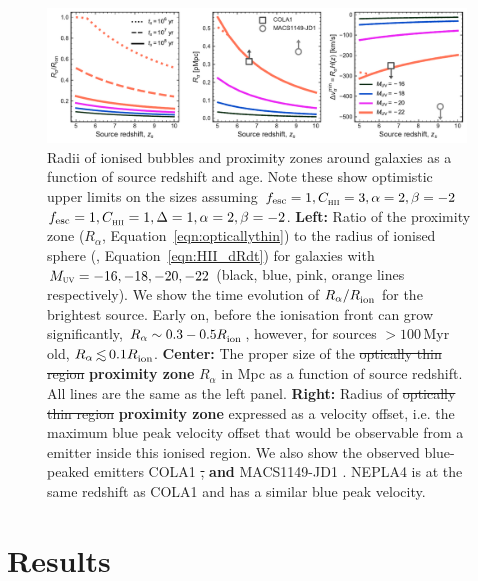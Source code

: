 \documentclass[fleqn,usenatbib]{mnras}
\providecommand{\DIFadd}[1]{{\protect\color{Green} \bf #1}} %
\providecommand{\DIFdel}[1]{{\protect\color{lightgray} \footnotesize \sout{#1}}} %
\providecommand{\DIFaddFL}[1]{\DIFadd{#1}} %
\providecommand{\DIFdelFL}[1]{\DIFdel{#1}} %
\providecommand{\DIFaddbeginFL}{} %
\providecommand{\DIFaddendFL}{} %
\providecommand{\DIFdelbeginFL}{} %
\providecommand{\DIFdelendFL}{} %
\newcommand{\DIFscaledelfig}{0.5}
\newlength{\DIFdelgraphicswidth} %
\newlength{\DIFdelgraphicsheight} %
\newcommand{\DIFaddincludegraphics}[2][]{{\color{blue}\fbox{\DIFOincludegraphics[#1]{#2}}}} %
\newcommand{\DIFdelincludegraphics}[2][]{%
\sbox{\DIFdelgraphicsbox}{\DIFOincludegraphics[#1]{#2}}%
\settoboxwidth{\DIFdelgraphicswidth}{\DIFdelgraphicsbox} %
\settoboxtotalheight{\DIFdelgraphicsheight}{\DIFdelgraphicsbox} %
\scalebox{\DIFscaledelfig}{%
\parbox[b]{\DIFdelgraphicswidth}{\usebox{\DIFdelgraphicsbox}\\[-\baselineskip] \rule{\DIFdelgraphicswidth}{0em}}\llap{\resizebox{\DIFdelgraphicswidth}{\DIFdelgraphicsheight}{%
\setlength{\unitlength}{\DIFdelgraphicswidth}%
\begin{picture}(1,1)%
\thicklines\linethickness{2pt} %
{\color[rgb]{1,0,0}\put(0,0){\framebox(1,1){}}}%
{\color[rgb]{1,0,0}\put(0,0){\line( 1,1){1}}}%
{\color[rgb]{1,0,0}\put(0,1){\line(1,-1){1}}}%
\end{picture}%
}\hspace*{3pt}}} %
} %
\DeclareRobustCommand{\DIFaddbeginFL}{\DIFOaddbeginFL \let\includegraphics\DIFaddincludegraphics} %
\DeclareRobustCommand{\DIFaddendFL}{\DIFOaddendFL \let\includegraphics\DIFOincludegraphics} %
\DeclareRobustCommand{\DIFdelbeginFL}{\DIFOdelbeginFL \let\includegraphics\DIFdelincludegraphics} %
\DeclareRobustCommand{\DIFdelendFL}{\DIFOaddendFL \let\includegraphics\DIFOincludegraphics} %
\begin{document}
\begin{figure}
    \includegraphics[width=0.99\textwidth]{figs/fig4.pdf}
    \caption{Radii of ionised bubbles and \lya proximity zones around galaxies as a function of source redshift and age. Note these show optimistic upper limits on the sizes assuming \DIFdelbeginFL \DIFdelFL{$\fesc=1, \clump=3, \alpha=2, \beta=-2$}\DIFdelendFL \DIFaddbeginFL \DIFaddFL{$\fesc=1, \clump=1, \Delta=1, \alpha=2, \beta=-2$}\DIFaddendFL . \textbf{Left:} Ratio of the \lya proximity zone ($R_\alpha$, Equation~\ref{eqn:opticallythin}) to the radius of ionised sphere (\Rion, Equation~\ref{eqn:HII_dRdt}) for galaxies with $\MUV = -16, -18, -20, -22$ (black, blue, pink, orange lines respectively). We show the time evolution of $R_\alpha/\Rion$ for the brightest source. Early on, before the ionisation front can grow significantly, $R_\alpha \sim 0.3-0.5 \Rion$, however, for sources $>100$\,Myr old, $R_\alpha \simlt 0.1 \Rion$. \textbf{Center:} The proper size of the \DIFdelbeginFL \DIFdelFL{optically thin region }\DIFdelendFL \DIFaddbeginFL \DIFaddFL{proximity zone }\DIFaddendFL $R_\alpha$ in Mpc as a function of source redshift. All lines are the same as the left panel. \textbf{Right:} Radius of \DIFdelbeginFL \DIFdelFL{optically thin region }\DIFdelendFL \DIFaddbeginFL \DIFaddFL{proximity zone }\DIFaddendFL expressed as a \lya velocity offset, i.e. the maximum \lya blue peak velocity offset that would be observable from a \lya emitter inside this ionised region. We also show the observed blue-peaked \lya emitters COLA1 \citep{Hu2016,Matthee2018b} \DIFdelbeginFL \DIFdelFL{, }\DIFdelendFL \DIFaddbeginFL \DIFaddFL{and }\DIFaddendFL MACS1149-JD1 \citep{Hashimoto2018a}. NEPLA4 \citep{Songaila2018} is at the same redshift as COLA1 and has a similar blue peak velocity.}
    \label{fig:R_HII}
\end{figure}

\section{Results}
\label{sec:results}
\end{document}
